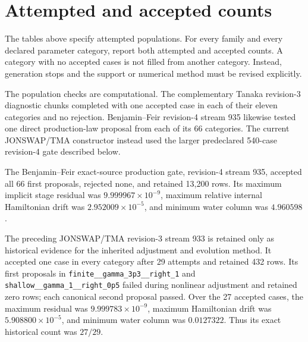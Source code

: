 \documentclass[11pt]{article}
\begin{document}
\section{Attempted and accepted counts}
\label{sec:coverage}

The tables above specify attempted populations.  For every family and every
declared parameter category, report both attempted and accepted counts.  A
category with no accepted cases is not filled from another category.  Instead, generation
stops and the support or numerical method must be revised explicitly.

The population checks are computational.  The complementary Tanaka
revision-3 diagnostic chunks completed with one accepted case in each of
their eleven categories and no rejection.  Benjamin--Feir revision-4 stream
935 likewise tested one direct production-law proposal from each of its 66
categories.  The current JONSWAP/TMA constructor instead used the larger
predeclared 540-case revision-4 gate described below.

The Benjamin--Feir exact-source production gate, revision-4 stream 935,
accepted all 66 first proposals, rejected none, and retained 13,200 rows.  Its maximum implicit
stage residual was $9.999967\times10^{-9}$, maximum relative internal
Hamiltonian drift was $2.952009\times10^{-5}$, and minimum water column was
$4.960598$.

The preceding JONSWAP/TMA revision-3 stream 933 is retained only as
historical evidence for the inherited adjustment and evolution method.  It
accepted one case in every category after 29 attempts and retained 432 rows.  Its first proposals in
\texttt{finite\_\_gamma\_3p3\_\_right\_1} and
\texttt{shallow\_\_gamma\_1\_\_right\_0p5} failed during nonlinear
adjustment and retained zero rows; each canonical second proposal passed.
Over the 27 accepted cases, the maximum residual was
$9.999783\times10^{-9}$, maximum Hamiltonian drift was
$5.908800\times10^{-5}$, and minimum water column was $0.0127322$.
Thus its exact historical count was $27/29$.
\end{document}
